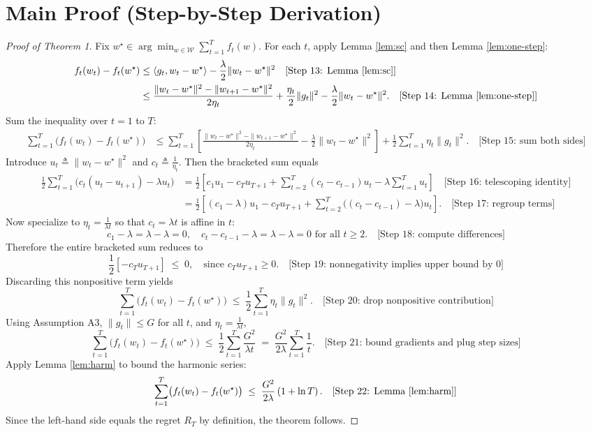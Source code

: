 \documentclass[12pt]{article}
\begin{document}
\section*{Main Proof (Step-by-Step Derivation)}
\begin{proof}[Proof of Theorem 1]
Fix $w^\star\in \arg\min_{w\in \mathcal{W}} \sum_{t=1}^T f_t(w)$. For each $t$, apply Lemma \ref{lem:sc} and then Lemma \ref{lem:one-step}:
\begin{align*}
f_t(w_t) - f_t(w^\star) 
&\le \langle g_t, w_t - w^\star\rangle - \frac{\lambda}{2}\|w_t - w^\star\|^2 \quad \text{[Step 13: Lemma \ref{lem:sc}]}\\
&\le \frac{\|w_t - w^\star\|^2 - \|w_{t+1}-w^\star\|^2}{2\eta_t} + \frac{\eta_t}{2}\|g_t\|^2 - \frac{\lambda}{2}\|w_t - w^\star\|^2. \quad \text{[Step 14: Lemma \ref{lem:one-step}]}
\end{align*}
Sum the inequality over $t=1$ to $T$:
\begin{align*}
\sum_{t=1}^T \bigl(f_t(w_t) - f_t(w^\star)\bigr)
&\le \sum_{t=1}^T \left[\frac{\|w_t - w^\star\|^2 - \|w_{t+1}-w^\star\|^2}{2\eta_t} - \frac{\lambda}{2}\|w_t - w^\star\|^2 \right] + \frac{1}{2}\sum_{t=1}^T \eta_t \|g_t\|^2. \quad \text{[Step 15: sum both sides]}
\end{align*}
Introduce $u_t \triangleq \|w_t - w^\star\|^2$ and $c_t \triangleq \frac{1}{\eta_t}$. Then the bracketed sum equals
\begin{align*}
\frac{1}{2}\sum_{t=1}^T \bigl(c_t(u_t - u_{t+1}) - \lambda u_t\bigr)
&= \frac{1}{2}\left[ c_1 u_1 - c_T u_{T+1} + \sum_{t=2}^T (c_t - c_{t-1})u_t - \lambda \sum_{t=1}^T u_t \right] \quad \text{[Step 16: telescoping identity]}\\
&= \frac{1}{2}\left[ (c_1-\lambda)u_1 - c_T u_{T+1} + \sum_{t=2}^T \bigl((c_t - c_{t-1}) - \lambda\bigr)u_t \right]. \quad \text{[Step 17: regroup terms]}
\end{align*}
Now specialize to $\eta_t = \frac{1}{\lambda t}$ so that $c_t=\lambda t$ is affine in $t$:
\[
c_1-\lambda = \lambda - \lambda = 0, \quad c_t - c_{t-1} - \lambda = \lambda - \lambda = 0 \text{ for all } t\ge 2. \quad \text{[Step 18: compute differences]}
\]
Therefore the entire bracketed sum reduces to
\[
\frac{1}{2}\left[ -c_T u_{T+1}\right] \;\le\; 0, \quad \text{since } c_T u_{T+1}\ge 0. \quad \text{[Step 19: nonnegativity implies upper bound by 0]}
\]
Discarding this nonpositive term yields
\[
\sum_{t=1}^T \bigl(f_t(w_t) - f_t(w^\star)\bigr) \;\le\; \frac{1}{2}\sum_{t=1}^T \eta_t \|g_t\|^2. \quad \text{[Step 20: drop nonpositive contribution]}
\]
Using Assumption A3, $\|g_t\|\le G$ for all $t$, and $\eta_t = \frac{1}{\lambda t}$,
\[
\sum_{t=1}^T \bigl(f_t(w_t) - f_t(w^\star)\bigr) \;\le\; \frac{1}{2}\sum_{t=1}^T \frac{G^2}{\lambda t} \;=\; \frac{G^2}{2\lambda}\sum_{t=1}^T \frac{1}{t}. \quad \text{[Step 21: bound gradients and plug step sizes]}
\]
Apply Lemma \ref{lem:harm} to bound the harmonic series:
\[
\sum_{t=1}^T \bigl(f_t(w_t) - f_t(w^\star)\bigr) \;\le\; \frac{G^2}{2\lambda}\left(1 + \ln T\right). \quad \text{[Step 22: Lemma \ref{lem:harm}]}
\]
Since the left-hand side equals the regret $R_T$ by definition, the theorem follows. \quad {}
\end{proof}
\end{document}
